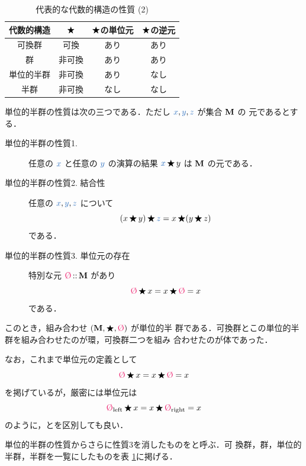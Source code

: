 \documentclass[a5paper,twoside,fleqn,draft]{jsbook}
\begin{document}
\begin{table}
\caption{代表的な代数的構造の性質 (2)}
\label{tab:group-and-monoid}
\begin{center}
\begin{tabular}{||c||c|c|c||}
\hline
代数的構造&$\operatorname{\bigstar}$&$\operatorname{\bigstar}$の単位元&$\operatorname{\bigstar}$の逆元\\
\hline\hline
可換群&可換&あり&あり\\
群&非可換&あり&あり\\
単位的半群&非可換&あり&なし\\
半群&非可換&なし&なし\\
\hline
\end{tabular}
\end{center}
\end{table}

単位的半群の性質は次の三つである．ただし $\hVar{x},\hVar{y},\hVar{z}$ が集合 $\mathbf{M}$ の
元であるとする．
\begin{description}
\item[単位的半群の性質1.] 任意の $\hVar{x}$ と任意の $\hVar{y}$ の演算の結果
$\hVar{x}\hAnyBinOp y$ は $\mathbf{M}$ の元である．
\item[単位的半群の性質2. 結合性] 任意の $\hVar{x},\hVar{y},\hVar{z}$ について
\begin{equation}
(x\hAnyBinOp y)\hAnyBinOp \hVar{z}=x\hAnyBinOp(y\hAnyBinOp z)
\end{equation}
である．
\item[単位的半群の性質3. 単位元の存在] 特別な元 $\mZero\hIsTypeOf\mSet{M}$ があり
\begin{equation}
\mZero\hAnyBinOp x=x\hAnyBinOp\mZero=x
\end{equation}
である．
\end{description}
このとき，組み合わせ $\hSingleTuppleWith{\mSet{M},\hAnyBinOp,\mZero}$ が単位的半
群である．可換群とこの単位的半群を組み合わせたのが環，可換群二つを組み
合わせたのが体であった．

なお，これまで単位元の定義として
\begin{equation}
\mZero\hAnyBinOp x=x\hAnyBinOp\mZero=x
\end{equation}
を掲げているが，厳密には単位元は
\begin{equation}
\mZero_\mLeft\hAnyBinOp x=x\hAnyBinOp\mZero_\mRight=x
\end{equation}
のように，とを区別しても良い．

単位的半群の性質からさらに性質3を消したものをと呼ぶ．可
換群，群，単位的半群，半群を一覧にしたものを表
\ref{tab:group-and-monoid}に掲げる．
\end{document}
